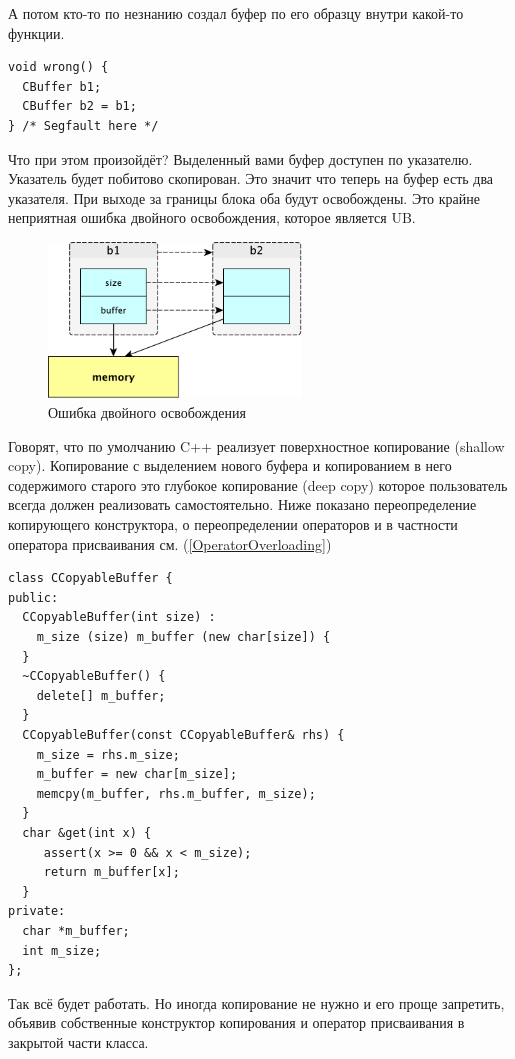 \documentclass[a4paper,12pt,oneside]{book}
\begin{document}
А потом кто-то по незнанию создал буфер по его образцу внутри какой-то функции.

\begin{lstlisting}
void wrong() {
  CBuffer b1;
  CBuffer b2 = b1;
} /* Segfault here */
\end{lstlisting}

Что при этом произойдёт? Выделенный вами буфер доступен по указателю. Указатель будет побитово скопирован. Это значит что теперь на буфер есть два указателя. При выходе за границы блока оба будут освобождены. Это крайне неприятная ошибка двойного освобождения, которое является UB.

\begin{figure}[h!]
\centering
\includegraphics[width=0.6\textwidth]{illustrations/copying-crop.pdf}
\caption{Ошибка двойного освобождения}
\label{fig:copying-crop}
\end{figure}

Говорят, что по умолчанию C++ реализует поверхностное копирование (shallow copy). Копирование с выделением нового буфера и копированием в него содержимого старого это глубокое копирование (deep copy) которое пользователь всегда должен реализовать самостоятельно. Ниже показано переопределение копирующего конструктора, о переопределении операторов и в частности оператора присваивания см. (\ref{OperatorOverloading})

\begin{lstlisting}
class CCopyableBuffer {
public:
  CCopyableBuffer(int size) : 
    m_size (size) m_buffer (new char[size]) {
  }
  ~CCopyableBuffer() { 
    delete[] m_buffer; 
  }
  CCopyableBuffer(const CCopyableBuffer& rhs) { 
    m_size = rhs.m_size; 
    m_buffer = new char[m_size];
    memcpy(m_buffer, rhs.m_buffer, m_size);
  } 
  char &get(int x) { 
     assert(x >= 0 && x < m_size); 
     return m_buffer[x]; 
  } 
private:
  char *m_buffer;
  int m_size;
};
\end{lstlisting}

Так всё будет работать. Но иногда копирование не нужно и его проще запретить, объявив собственные конструктор копирования и оператор присваивания в закрытой части класса.
\end{document}
